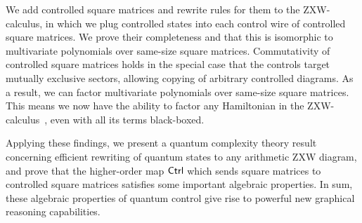 We add controlled square matrices and rewrite rules for them to the ZXW-calculus, in which we plug controlled states into each control wire of controlled square matrices. We prove their completeness and that this is isomorphic to multivariate polynomials over same-size square matrices. Commutativity of controlled square matrices holds in the special case that the controls target mutually exclusive sectors, allowing copying of arbitrary controlled diagrams. As a result, we can factor multivariate polynomials over same-size square matrices. This means we now have the ability to factor any Hamiltonian in the ZXW-calculus~\cite{shaikh2022sum}, even with all its terms black-boxed.

Applying these findings, we present a quantum complexity theory result concerning efficient rewriting of quantum states to any arithmetic ZXW diagram, and prove that the higher-order map $\textsf{Ctrl}$ which sends square matrices to controlled square matrices satisfies some important algebraic properties.
In sum, these algebraic properties of quantum control give rise to powerful new graphical reasoning capabilities.